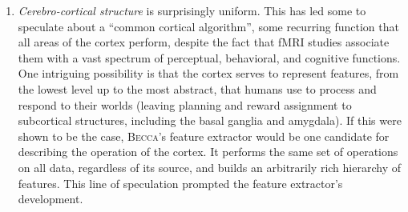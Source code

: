 \begin{enumerate}
\item {\em Cerebro-cortical structure} is surprisingly uniform. This has led some to speculate about a ``common cortical algorithm'', some recurring function that all areas of the cortex perform, despite the fact that fMRI studies associate them with a vast spectrum of perceptual, behavioral, and cognitive functions. One intriguing possibility is that the cortex serves to represent features, from the lowest level up to the most abstract, that humans use to process and respond to their worlds (leaving planning and reward assignment to subcortical structures, including the basal ganglia and amygdala). If this were shown to be the case, \textsc{Becca}'s feature extractor would be one candidate for describing the operation of the cortex. It performs the same set of operations on all data, regardless of its source, and builds an arbitrarily rich hierarchy of features. This line of speculation prompted the feature extractor's development.
  
\end{enumerate}